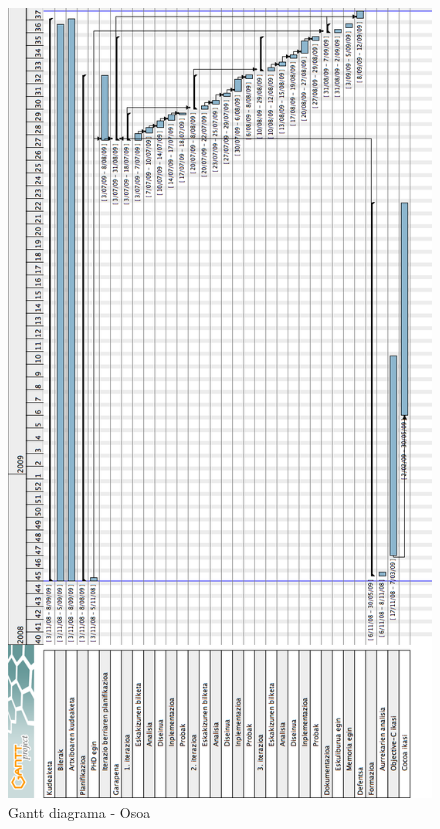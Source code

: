 \begin{figure}[htp]
\begin{center}
\includegraphics[scale=0.46]{Pictures/Chapter3/Gantt-osoa.png}
\caption{Gantt diagrama - Osoa}
\label{gantt.osoa}
\end{center}
\end{figure}


